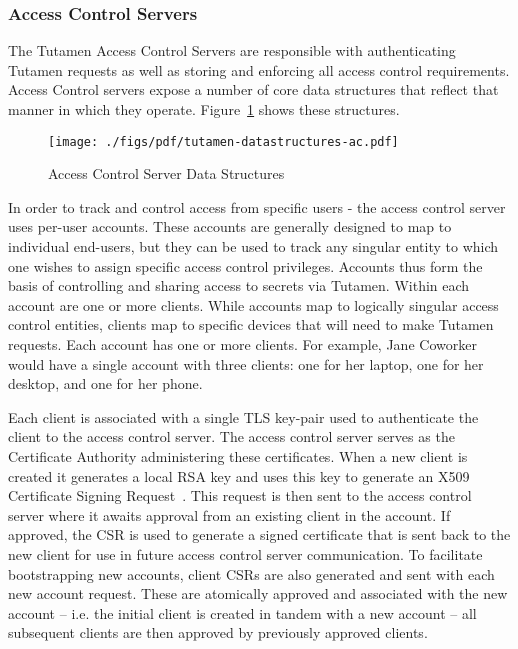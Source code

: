\subsubsection{Access Control Servers}

The Tutamen Access Control Servers are responsible with authenticating
Tutamen requests as well as storing and enforcing all access control
requirements. Access Control servers expose a number of core data
structures that reflect that manner in which they
operate. Figure~\ref{fig:tutamen:acstructs} shows these structures.

\begin{figure}[th]
  \centering
  \texttt{[image: ./figs/pdf/tutamen-datastructures-ac.pdf]}
  \caption{Access Control Server Data Structures}
  \label{fig:tutamen:acstructs}
\end{figure}

In order to track and control access from specific users - the access
control server uses per-user accounts. These accounts are generally
designed to map to individual end-users, but they can be used to track
any singular entity to which one wishes to assign specific access
control privileges. Accounts thus form the basis of controlling and
sharing access to secrets via Tutamen. Within each account are one or
more clients. While accounts map to logically singular access control
entities, clients map to specific devices that will need to make
Tutamen requests. Each account has one or more clients. For example,
Jane Coworker would have a single account with three clients: one for
her laptop, one for her desktop, and one for her phone.

Each client is associated with a single TLS key-pair used to
authenticate the client to the access control server. The access
control server serves as the Certificate Authority administering these
certificates. When a new client is created it generates a local RSA
key and uses this key to generate an X509 Certificate Signing
Request~\cite{rfc5280}. This request is then sent to the access
control server where it awaits approval from an existing client in the
account. If approved, the CSR is used to generate a signed certificate
that is sent back to the new client for use in future access control
server communication. To facilitate bootstrapping new accounts, client
CSRs are also generated and sent with each new account request. These
are atomically approved and associated with the new account --
i.e. the initial client is created in tandem with a new account -- all
subsequent clients are then approved by previously approved clients.

